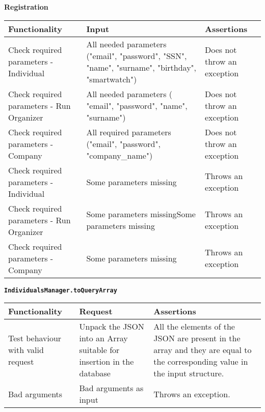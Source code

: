 \noindent \textbf{Registration}
\begin{longtable}{|p{}|p{}|p{}|}
    \hline
    \textbf{Functionality} & \textbf{Input} & \textbf{Assertions} \\
    \hline
    Check required parameters - Individual & All needed parameters ("email",
      "password",
      "SSN",
      "name",
      "surname",
      "birthday",
      "smartwatch") &  Does not throw an exception \\
    \hline
    Check required parameters - Run Organizer & All needed parameters ( "email",
      "password",
      "name",
      "surname") & Does not throw an exception \\
    \hline
    Check required parameters - Company & All required parameters ("email",
      "password",
      "company\_name") & Does not throw an exception \\
    \hline
    
    Check required parameters - Individual & Some parameters missing &  Throws an exception \\
    \hline
    Check required parameters - Run Organizer & Some parameters missingSome parameters missing & Throws an exception \\
    \hline
    Check required parameters - Company & Some parameters missing & Throws an exception \\
    \hline
\end{longtable}

\noindent\textbf{\texttt{IndividualsManager.toQueryArray}}  \\
\begin{longtable}{|p{}|p{}|p{}|}
 \hline
    \textbf{Functionality} & \textbf{Request} & \textbf{Assertions} \\
\hline
Test behaviour with valid request & Unpack the JSON into an Array suitable for insertion in the database & All the elements of the JSON are present in the array and they are equal to the corresponding value in the input structure. \\
\hline

Bad arguments & Bad arguments as input & Throws an exception. \\
\hline
\end{longtable}

